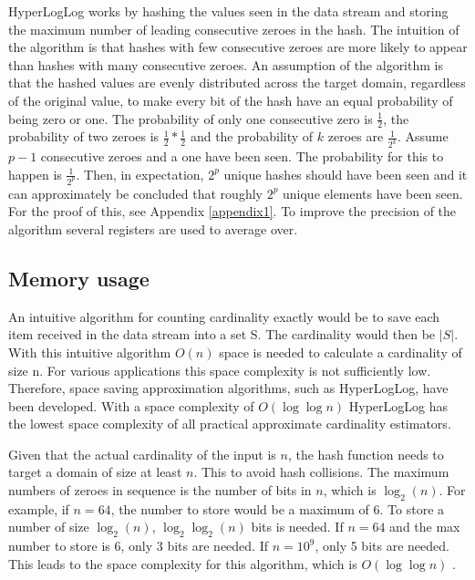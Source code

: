HyperLogLog works by hashing the values seen in the data stream and storing the maximum number of leading consecutive zeroes in the hash. The intuition of the algorithm is that hashes with few consecutive zeroes are more likely to appear than hashes with many consecutive zeroes. An assumption of the algorithm is that the hashed values are evenly distributed across the target domain, regardless of the original value, to make every bit of the hash have an equal probability of being zero or one. The probability of only one consecutive zero is $\frac{1}{2}$, the probability of two zeroes is $\frac{1}{2}*\frac{1}{2}$ and the probability of $k$ zeroes are $\frac {1} {2^k}$. Assume $p-1$ consecutive zeroes and a one have been seen. The probability for this to happen is $\frac{1}{2^p}$. Then, in expectation, $2^p$ unique hashes should have been seen and it can approximately be concluded that roughly $2^p$ unique elements have been seen. For the proof of this, see Appendix \ref{appendix1}. To improve the precision of the algorithm several registers are used to average over. 

\subsection{Memory usage}
An intuitive algorithm for counting cardinality exactly would be to save each item received in the data stream into a set S. The cardinality would then be $|S|$. With this intuitive algorithm $O(n)$ space is needed to calculate a cardinality of size n. For various applications this space complexity is not sufficiently low. Therefore, space saving approximation algorithms, such as HyperLogLog, have been developed. With a space complexity of $O(\log\log n)$ HyperLogLog has the lowest space complexity of all practical approximate cardinality estimators. 

Given that the actual cardinality of the input is $n$, the hash function needs to target a domain of size at least $n$. This to avoid hash collisions. The maximum numbers of zeroes in sequence is the number of bits in $n$, which is $\log_2(n)$. For example, if $n=64$, the number to store would be a maximum of 6. To store a number of size $\log_2(n)$, $\log_2\log_2(n)$ bits is needed. If $n=64$ and the max number to store is 6, only 3 bits are needed. If $n=10^9$, only 5 bits are needed. This leads to the space complexity for this algorithm, which is $O(\log\log n)$ \cite{hyperloglog}. 

